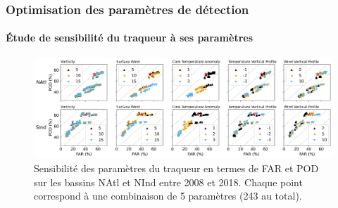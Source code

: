 \documentclass[aspectratio=169, usepdftitle=false, xcolor={dvipsnames}, 9pt,table]{beamer}
\begin{document}
\begin{frame}[c]
    \frametitle{Optimisation des paramètres de détection}
    \framesubtitle{Étude de sensibilité du traqueur à ses paramètres}
    \begin{figure}
        \centering
        \includegraphics[width=\textwidth]{Figures/optimisation_vectors.png}
        \caption{\small Sensibilité des paramètres du traqueur en termes de FAR et POD sur les bassins NAtl et NInd entre 2008 et 2018. Chaque point correspond
        à une combinaison de 5 paramètres (243 au total).}
    \end{figure}
\end{frame}

\end{document}
